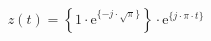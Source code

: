 \[
z(t) =  \left \{ 1 \cdot \textrm{e}^{\{ -j \cdot \sqrt{\pi} \}} \right \} \cdot \textrm{e}^{\{ j \cdot \pi \cdot t \}}
\]
